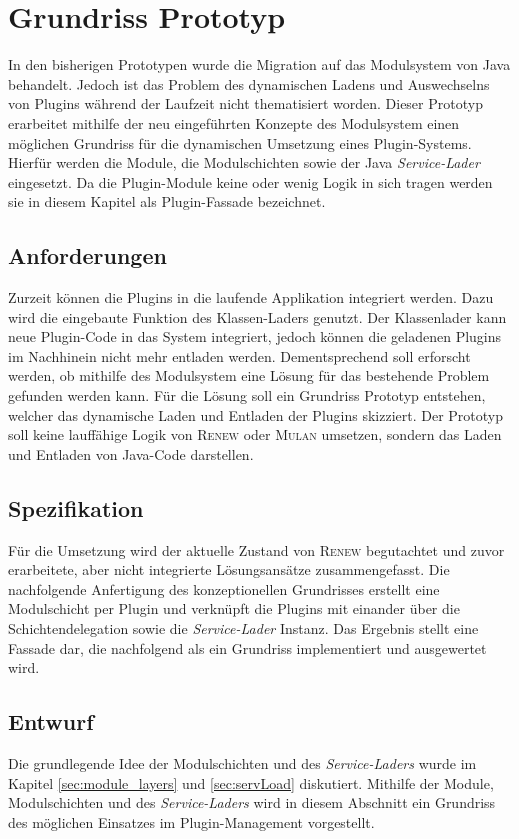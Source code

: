 \chapter{Grundriss Prototyp} \label{ch:grRiss}
	In den bisherigen Prototypen wurde die Migration auf das Modulsystem von Java behandelt. Jedoch ist das Problem des dynamischen Ladens und Auswechselns von Plugins während der Laufzeit nicht thematisiert worden. Dieser Prototyp erarbeitet mithilfe der neu eingeführten Konzepte des Modulsystem einen möglichen Grundriss für die dynamischen Umsetzung eines Plugin-Systems. Hierfür werden die Module, die Modulschichten sowie der Java \textit{Service-Lader} eingesetzt. Da die Plugin-Module keine oder wenig Logik in sich tragen werden sie in diesem Kapitel als Plugin-Fassade bezeichnet.

\section{Anforderungen} 
	Zurzeit können die Plugins in die laufende Applikation integriert werden. Dazu wird die eingebaute Funktion des Klassen-Laders genutzt. Der Klassenlader kann neue Plugin-Code in das System integriert, jedoch können die geladenen Plugins im Nachhinein nicht mehr entladen werden. Dementsprechend soll erforscht werden, ob mithilfe des Modulsystem eine Lösung für das bestehende Problem gefunden werden kann. Für die Lösung soll ein Grundriss Prototyp entstehen, welcher das dynamische Laden und Entladen der Plugins skizziert. Der Prototyp soll keine lauffähige Logik von \textsc{Renew} oder \textsc{Mulan} umsetzen, sondern das Laden und Entladen von Java-Code darstellen.

\section{Spezifikation} 
	Für die Umsetzung wird der aktuelle Zustand von \textsc{Renew} begutachtet und zuvor erarbeitete, aber nicht integrierte Lösungsansätze zusammengefasst. Die nachfolgende Anfertigung des konzeptionellen Grundrisses erstellt eine Modulschicht per Plugin und verknüpft die Plugins mit einander über die Schichtendelegation sowie die \textit{Service-Lader} Instanz. Das Ergebnis stellt eine Fassade dar, die nachfolgend als ein Grundriss implementiert und ausgewertet wird.

\section{Entwurf} \label{sec:entwurf}
	Die grundlegende Idee der Modulschichten und des \textit{Service-Laders} wurde im Kapitel \ref{sec:module_layers} und \ref{sec:servLoad} diskutiert. Mithilfe der Module, Modulschichten und des \textit{Service-Laders} wird in diesem Abschnitt ein Grundriss des möglichen Einsatzes im Plugin-Management vorgestellt. \bigbreak

